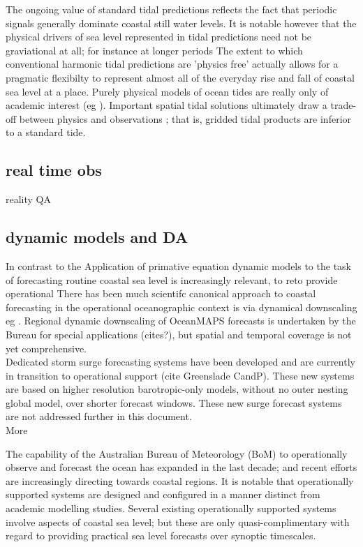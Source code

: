 \documentclass[jmse,article,submit,moreauthors,pdftex,10pt,a4paper]{mdpi}
\begin{document}
The ongoing value of standard tidal predictions reflects the fact that periodic signals generally dominate coastal still water levels.
It is notable however that the physical drivers of sea level represented in tidal predictions need not be graviational at all; for instance at longer periods \cite{Parker:2007wq}
The extent to which conventional harmonic tidal predictions are 'physics free' actually allows for a pragmatic flexibilty to represent almost all of the everyday rise and fall of coastal sea level at a place.
Purely physical models of ocean tides are really only of academic interest (eg \cite{Weis:2008ex} \cite{Muller:2008hs}).
Important spatial tidal solutions ultimately draw a trade-off between physics and observations \cite{Egbert:1996vr}; that is, gridded tidal products are inferior to a standard tide.



\subsection{real time obs}
 reality
 QA
 
 
\subsection{dynamic models and DA}

In contrast to the 
Application of primative equation dynamic models to the task of forecasting routine coastal sea level is increasingly relevant,  to reto provide operational 
There has been much scientifc  canonical approach to coastal forecasting in the operational oceanographic context is via dynamical downscaling eg \cite{Paramygin:2017dx} \cite{Garzon:2016ds}.
Regional dynamic downscaling of OceanMAPS forecasts is undertaken by the Bureau for special applications (cites?),
but spatial and temporal coverage is not yet comprehensive.\\
Dedicated storm surge forecasting systems have been developed and are currently in transition to operational support (cite Greenslade CandP).   These new systems are based on higher resolution barotropic-only models, without no outer nesting global model, over shorter forecast windows. These new surge forecast systems are not addressed further in this document. \\


More

The capability of the Australian Bureau of Meteorology (BoM) to operationally observe and forecast the ocean has expanded in the last decade;
and recent efforts are increasingly directing towards coastal regions.  
It is notable that operationally supported systems are designed and configured in a manner distinct from academic modelling studies. 
Several existing operationally supported systems involve aspects of coastal sea level;
but these are only quasi-complimentary with regard to providing practical sea level forecasts over synoptic timescales. \\
\end{document}
